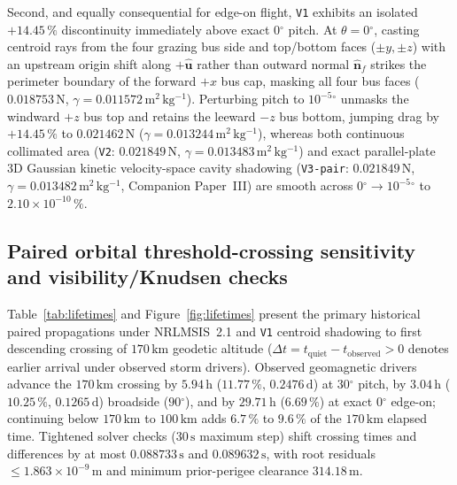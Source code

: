 \documentclass[12pt]{article}
\newcommand{\unit}[1]{\,\mathrm{#1}}
\newcommand{\degree}{\ensuremath{{}^\circ}}
\begin{document}
Second, and equally consequential for edge-on flight, \texttt{V1} exhibits an isolated $+14.45\,\%$ discontinuity immediately above exact $0\degree$ pitch. At $\theta = 0\degree$, casting centroid rays from the four grazing bus side and top/bottom faces ($\pm y, \pm z$) with an upstream origin shift along $+\hat{\mathbf{u}}$ rather than outward normal $\hat{\mathbf{n}}_f$ strikes the perimeter boundary of the forward $+x$ bus cap, masking all four bus faces ($0.018753\unit{N}$, $\gamma = 0.011572\unit{m^2\,kg^{-1}}$). Perturbing pitch to $10^{-5}\degree$ unmasks the windward $+z$ bus top and retains the leeward $-z$ bus bottom, jumping drag by $+14.45\,\%$ to $0.021462\unit{N}$ ($\gamma = 0.013244\unit{m^2\,kg^{-1}}$), whereas both continuous collimated area (\texttt{V2}: $0.021849\unit{N}$, $\gamma = 0.013483\unit{m^2\,kg^{-1}}$) and exact parallel-plate 3D Gaussian kinetic velocity-space cavity shadowing (\texttt{V3-pair}: $0.021849\unit{N}$, $\gamma = 0.013482\unit{m^2\,kg^{-1}}$, Companion Paper~III) are smooth across $0\degree \to 10^{-5}\degree$ to $2.10\times10^{-10}\,\%$.

\subsection{Paired orbital threshold-crossing sensitivity and visibility/Knudsen checks}
\label{sec:res-orbit}

Table~\ref{tab:lifetimes} and Figure~\ref{fig:lifetimes} present the primary historical paired propagations under NRLMSIS~2.1 and \texttt{V1} centroid shadowing to first descending crossing of $170\unit{km}$ geodetic altitude ($\Delta t = t_{\mathrm{quiet}} - t_{\mathrm{observed}} > 0$ denotes earlier arrival under observed storm drivers). Observed geomagnetic drivers advance the $170\unit{km}$ crossing by $5.94\unit{h}$ ($11.77\,\%$, $0.2476\unit{d}$) at $30\degree$ pitch, by $3.04\unit{h}$ ($10.25\,\%$, $0.1265\unit{d}$) broadside ($90\degree$), and by $29.71\unit{h}$ ($6.69\,\%$) at exact $0\degree$ edge-on; continuing below $170\unit{km}$ to $100\unit{km}$ adds $6.7\,\%$ to $9.6\,\%$ of the $170\unit{km}$ elapsed time. Tightened solver checks ($30\unit{s}$ maximum step) shift crossing times and differences by at most $0.088733\unit{s}$ and $0.089632\unit{s}$, with root residuals $\le 1.863\times10^{-9}\unit{m}$ and minimum prior-perigee clearance $314.18\unit{m}$.
\end{document}
